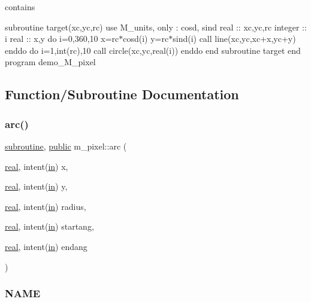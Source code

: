 contains

subroutine target(xc,yc,rc) use M\+\_\+units, only \+: cosd, sind real \+:\+: xc,yc,rc integer \+:\+: i real \+:\+: x,y do i=0,360,10 x=rc$\ast$cosd(i) y=rc$\ast$sind(i) call line(xc,yc,xc+x,yc+y) enddo do i=1,int(rc),10 call circle(xc,yc,real(i)) enddo end subroutine target end program demo\+\_\+\+M\+\_\+pixel 

\subsection{Function/\+Subroutine Documentation}
\mbox{\label{namespacem__pixel_ab881b9c2adff081a086cd83a1f1341fb}} 
\subsubsection{\texorpdfstring{arc()}{arc()}}
{\footnotesize\ttfamily \hyperlink{M__stopwatch_83_8txt_acfbcff50169d691ff02d4a123ed70482}{subroutine}, \hyperlink{M__stopwatch_83_8txt_a2f74811300c361e53b430611a7d1769f}{public} m\+\_\+pixel\+::arc (\begin{DoxyParamCaption}\item[{\hyperlink{read__watch_83_8txt_abdb62bde002f38ef75f810d3a905a823}{real}, intent(\hyperlink{M__journal_83_8txt_afce72651d1eed785a2132bee863b2f38}{in})}]{x,  }\item[{\hyperlink{read__watch_83_8txt_abdb62bde002f38ef75f810d3a905a823}{real}, intent(\hyperlink{M__journal_83_8txt_afce72651d1eed785a2132bee863b2f38}{in})}]{y,  }\item[{\hyperlink{read__watch_83_8txt_abdb62bde002f38ef75f810d3a905a823}{real}, intent(\hyperlink{M__journal_83_8txt_afce72651d1eed785a2132bee863b2f38}{in})}]{radius,  }\item[{\hyperlink{read__watch_83_8txt_abdb62bde002f38ef75f810d3a905a823}{real}, intent(\hyperlink{M__journal_83_8txt_afce72651d1eed785a2132bee863b2f38}{in})}]{startang,  }\item[{\hyperlink{read__watch_83_8txt_abdb62bde002f38ef75f810d3a905a823}{real}, intent(\hyperlink{M__journal_83_8txt_afce72651d1eed785a2132bee863b2f38}{in})}]{endang }\end{DoxyParamCaption})}



\subsubsection*{N\+A\+ME}

